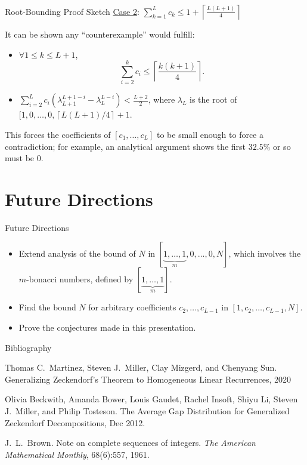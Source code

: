 \documentclass{beamer}
\begin{document}
\begin{frame}{Root-Bounding Proof Sketch}
\underline{Case 2}: $\sum_{k=1}^{L}c_k \leq 1+\left\lceil \frac{L(L+1) }{4} \right\rceil$ 

It can be shown any ``counterexample'' would fulfill:

\begin{itemize}
\item $\forall 1\leq k\leq L+1$, \[\sum_{i=2}^{k}c_{i}\leq \left\lceil \frac{k(k+1)}{4} \right\rceil .\]

\item $\displaystyle\sum_{i=2}^{L}c_{i}\left( \lambda _{L+1}^{L+1-i}-\lambda _{L}^{L-i} \right) < \frac{L+2}{2}$,
where $\lambda_L$ is the root of $[1,0,\ldots, 0,\left\lceil L(L+1)/4 \right\rceil +1$.
\end{itemize}

This forces the coefficients of $[c_1,\ldots, c_L]$ to be small enough to force a contradiction; for example, an analytical argument shows the first $32.5\%$ or so must be $0$.

\end{frame}
\section{Future Directions}
\begin{frame}{Future Directions}
    \begin{itemize}
    \item Extend analysis of the bound of $N$ in $[\underbrace{1,\ldots,1}_m,0,\ldots,0,N]$, which involves the  $m$-bonacci numbers, defined by $[\underbrace{1,\dots,1}_m]$.
    \pause
    \item Find the bound $N$ for arbitrary coefficients $c_2, \dots, c_{L-1}$ in $[1, c_2, \dots, c_{L-1}, N]$.
    \pause
    \item Prove the conjectures made in this presentation.
\end{itemize}
\end{frame}


\begin{frame}{Bibliography}
\begin{thebibliography}{BBGILMT}


     Thomas C.\ Martinez, Steven J.\ Miller, Clay Mizgerd, and Chenyang Sun. Generalizing Zeckendorf's Theorem to Homogeneous Linear Recurrences, 2020
	
	 Olivia Beckwith, Amanda Bower, Louis Gaudet, Rachel Insoft, Shiyu Li, Steven J.\ Miller, and Philip Tosteson. The Average Gap Distribution for Generalized Zeckendorf Decompositions, Dec 2012.
	
	 J.\ L.\ Brown. Note on complete sequences of integers. \emph{The  American  Mathematical  Monthly}, 68(6):557, 1961.
	
\end{thebibliography}
\end{frame}
\end{document}
